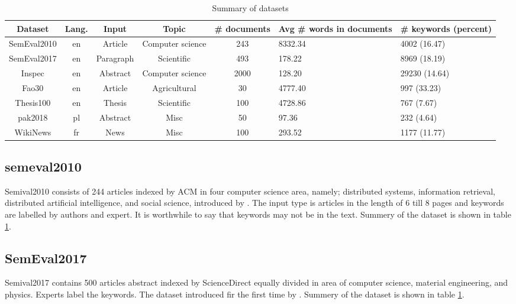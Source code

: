 \documentclass[3p]{elsarticle}
\begin{document}
\begin{table}[]
    \centering
    \caption{Summary of datasets}
    \label{tbl:dataset_summary}
    \begin{tabular}{cccccm{2cm}m{2cm}}
        \hline
        \textbf{Dataset}    &\textbf{Lang.}    &\textbf{Input} &\textbf{Topic} &\textbf{\# documents}    &\textbf{Avg \# words in documents}   &\textbf{\# keywords (percent)} \\
        \hline
        SemEval2010 \cite{Kim2013}  &en &Article    &Computer science   &243    &8332.34    &4002 (16.47)   \\
        \rowcolor{gray!10} SemEval2017 \cite{Augenstein2018}    &en &Paragraph  &Scientific &493    &178.22 &8969 (18.19)   \\
        Inspec \cite{Hulth2003} &en &Abstract   &Computer science   &2000   &128.20 &29230 (14.64) \\
        \rowcolor{gray!10} Fao30 \cite{Medelyan2006}    &en &Article    &Agricultural   &30 &4777.40    &997 (33.23)    \\
Thesis100 \cite{medelyan_2015}  &en &Thesis &Scientific &100    &4728.86    &767 (7.67)\\
        \rowcolor{gray!10} pak2018 \cite{Campos2020}    &pl &Abstract   &Misc   &50 &97.36  &232 (4.64)  \\
        WikiNews \cite{Bougouin2013}    &fr &News   &Misc   &100   &293.52   &1177 (11.77)   \\
\hline
    \end{tabular}
\end{table}

\subsection*{semeval2010}
Semival2010 consists of 244 articles indexed by ACM in four computer science area, namely; distributed systems, information retrieval, distributed artificial intelligence, and social science, introduced by \citet{Kim2013}. The input type is articles in the length of 6 till 8 pages and keywords are labelled by authors and expert. It is worthwhile to say that keywords may not be in the text. Summery of the dataset is shown in table \ref{tbl:dataset_summary}.

\subsection*{SemEval2017}
Semival2017 contains 500 articles abstract indexed by ScienceDirect equally divided in area of computer science, material engineering, and physics. Experts label the keywords. The dataset introduced fir the first time by \citet{Augenstein2018}. Summery of the dataset is shown in table \ref{tbl:dataset_summary}.
\end{document}
